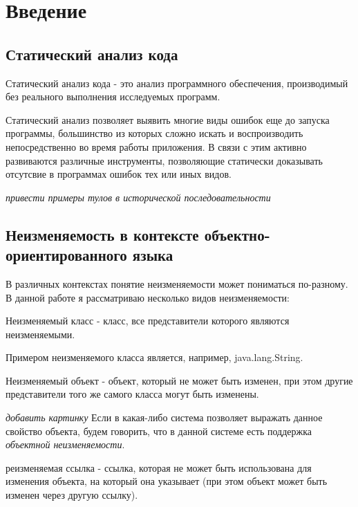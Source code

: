 \chapter{Введение}

\section{Статический анализ кода}

\begin{Def}\label{static_program_analysis}
Статический анализ кода - это анализ программного обеспечения, производимый без реального выполнения исследуемых программ.
\end{Def}

Статический анализ позволяет выявить многие виды ошибок еще до запуска программы, большинство из которых сложно искать и воспроизводить непосредственно во время работы приложения. В связи с этим активно развиваются различные инструменты, позволяющие статически доказывать отсутсвие в программах ошибок тех или иных видов.  

\textit{привести примеры тулов в исторической последовательности}

\section{Неизменяемость в контексте объектно-ориентированного языка}

В различных контекстах понятие неизменяемости может пониматься по-разному. В данной работе я рассматриваю несколько видов неизменяемости:

\begin{Def}\label{immutabule_class}
Неизменяемый класс - класс, все представители которого являются неизменяемыми. 
\end{Def}

Примером неизменяемого класса является, например, java.lang.String.

\begin{Def}\label{immutable_object}
Неизменяемый объект - объект, который не может быть изменен, при этом другие представители того же самого класса могут быть изменены.
\end{Def}
\textit{добавить картинку}
Если в какая-либо система позволяет выражать данное свойство объекта, будем говорить, что в данной системе есть поддержка \textit{объектной неизменяемости}.

\begin{Def}\label{reference_immutability}
реизменяемая ссылка - ссылка, которая не может быть использована для изменения объекта, на который она указывает (при этом объект может быть изменен через другую ссылку).
\end{Def} 

